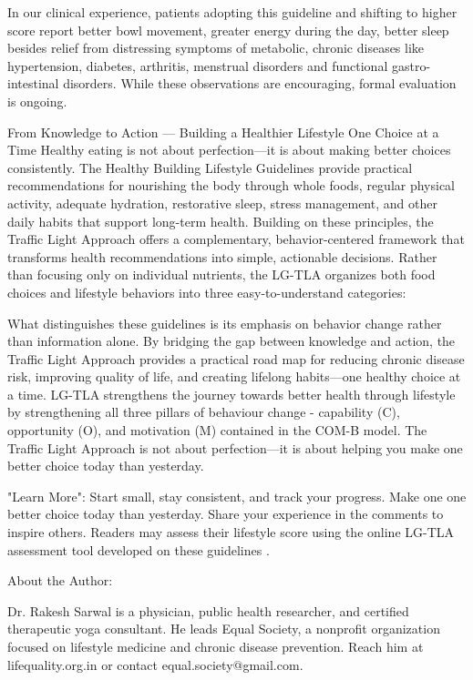 \documentclass{article}
\begin{document}
In our clinical experience, patients adopting this guideline and shifting to higher score report better bowl movement, greater energy during the day, better sleep besides relief from distressing symptoms of metabolic, chronic diseases like hypertension, diabetes, arthritis, menstrual disorders and functional gastro-intestinal disorders. While these observations are encouraging, formal evaluation is ongoing.

From Knowledge to Action — Building a Healthier Lifestyle One Choice at a Time Healthy eating is not about perfection—it is about making better choices consistently. The Healthy Building Lifestyle Guidelines provide practical recommendations for nourishing the body through whole foods, regular physical activity, adequate hydration, restorative sleep, stress management, and other daily habits that support long-term health. Building on these principles, the Traffic Light Approach offers a complementary, behavior-centered framework that transforms health recommendations into simple, actionable decisions. Rather than focusing only on individual nutrients, the LG-TLA organizes both food choices and lifestyle behaviors into three easy-to-understand categories:

What distinguishes these guidelines is its emphasis on behavior change rather than information alone. By bridging the gap between knowledge and action, the Traffic Light Approach provides a practical road map for reducing chronic disease risk, improving quality of life, and creating lifelong habits—one healthy choice at a time. LG-TLA strengthens the journey towards better health through lifestyle by strengthening all three pillars of behaviour change - capability (C), opportunity (O), and motivation (M) contained in the COM-B model. The Traffic Light Approach is not about perfection—it is about helping you make one better choice today than yesterday.

"Learn More":
Start small, stay consistent, and track your progress. Make one one better choice today than yesterday. Share your experience in the comments to inspire others. Readers may assess their lifestyle score using the online LG-TLA assessment tool developed on these guidelines \cite{LifeQuality2026}. 

About the Author:

Dr. Rakesh Sarwal is a physician, public health researcher, and certified therapeutic yoga consultant. He leads Equal Society, a nonprofit organization focused on lifestyle medicine and chronic disease prevention. Reach him at  lifequality.org.in or contact equal.society@gmail.com.




\end{document}
